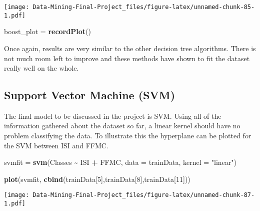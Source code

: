 \documentclass[
]{article}
\newenvironment{Shaded}{\begin{snugshade}}{\end{snugshade}}
\newcommand{\AttributeTok}[1]{\textcolor[rgb]{0.13,0.29,0.53}{#1}}
\newcommand{\DecValTok}[1]{\textcolor[rgb]{0.00,0.00,0.81}{#1}}
\newcommand{\FunctionTok}[1]{\textcolor[rgb]{0.13,0.29,0.53}{\textbf{#1}}}
\newcommand{\NormalTok}[1]{#1}
\newcommand{\OtherTok}[1]{\textcolor[rgb]{0.56,0.35,0.01}{#1}}
\newcommand{\SpecialCharTok}[1]{\textcolor[rgb]{0.81,0.36,0.00}{\textbf{#1}}}
\newcommand{\StringTok}[1]{\textcolor[rgb]{0.31,0.60,0.02}{#1}}
\begin{document}
\texttt{[image: Data-Mining-Final-Project\_files/figure-latex/unnamed-chunk-85-1.pdf]}

\begin{Shaded}
\begin{Highlighting}[]
\NormalTok{boost\_plot }\OtherTok{=} \FunctionTok{recordPlot}\NormalTok{()}
\end{Highlighting}
\end{Shaded}

Once again, results are very similar to the other decision tree
algorithms. There is not much room left to improve and these methods
have shown to fit the dataset really well on the whole.

\subsection{Support Vector Machine
(SVM)}\label{support-vector-machine-svm}

\begin{Shaded}
\end{Shaded}

The final model to be discussed in the project is SVM. Using all of the
information gathered about the dataset so far, a linear kernel should
have no problem classifying the data. To illustrate this the hyperplane
can be plotted for the SVM between ISI and FFMC.

\begin{Shaded}
\begin{Highlighting}[]
\NormalTok{svmfit }\OtherTok{=} \FunctionTok{svm}\NormalTok{(Classes }\SpecialCharTok{\textasciitilde{}}\NormalTok{ ISI }\SpecialCharTok{+}\NormalTok{ FFMC, }\AttributeTok{data =}\NormalTok{ trainData, }\AttributeTok{kernel =} \StringTok{"linear"}\NormalTok{)}

\FunctionTok{plot}\NormalTok{(svmfit, }\FunctionTok{cbind}\NormalTok{(trainData[}\DecValTok{5}\NormalTok{],trainData[}\DecValTok{8}\NormalTok{],trainData[}\DecValTok{11}\NormalTok{]))}
\end{Highlighting}
\end{Shaded}

\texttt{[image: Data-Mining-Final-Project\_files/figure-latex/unnamed-chunk-87-1.pdf]}
\end{document}
